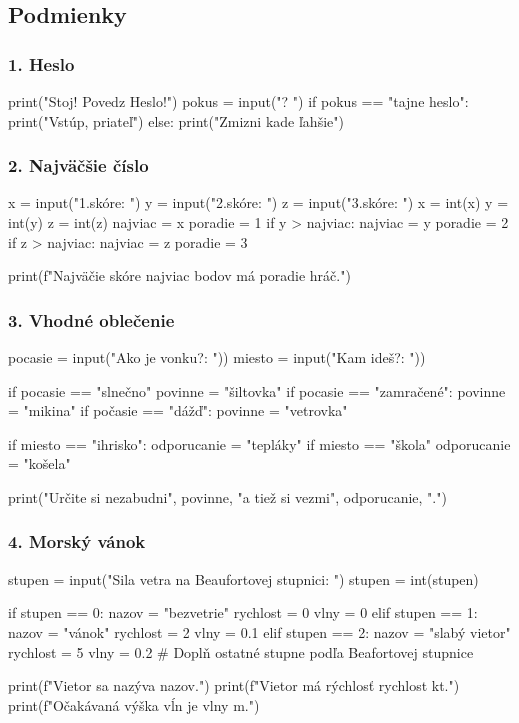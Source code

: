 \subsection{Podmienky}

\subsubsection*{1. Heslo}
\begin{solution}
print("Stoj! Povedz Heslo!")
pokus = input("? ")
if pokus == "tajne heslo":
    print("Vstúp, priateľ")
else:
    print("Zmizni kade ľahšie")
\end{solution}

\subsubsection*{2. Najväčšie číslo}
\begin{solution}
x = input("1.skóre: ")
y = input("2.skóre: ")
z = input("3.skóre: ")
x = int(x)
y = int(y)
z = int(z)
najviac = x
poradie = 1
if y > najviac:
    najviac = y
    poradie = 2
if z > najviac:
    najviac = z
    poradie = 3

print(f"Najväčie skóre {najviac} bodov má {poradie} hráč.")
\end{solution}

\subsubsection*{3. Vhodné oblečenie}

\begin{solution}
pocasie = input("Ako je vonku?: "))
miesto = input("Kam ideš?: "))

if pocasie == "slnečno"
	povinne = "šiltovka"
if pocasie == "zamračené":
	povinne = "mikina"
if počasie == "dážď":
	povinne = "vetrovka"
	
if miesto == "ihrisko":
	odporucanie = "tepláky"
if miesto == "škola"
	odporucanie = "košela"

print("Určite si nezabudni", povinne, "a tiež si vezmi", odporucanie, ".")
\end{solution}

\subsubsection*{4. Morský vánok}
\begin{solution}
stupen = input("Sila vetra na Beaufortovej stupnici: ")
stupen = int(stupen)

if stupen == 0:
	nazov = "bezvetrie"
	rychlost = 0
	vlny = 0
elif stupen == 1:
	nazov = "vánok"
	rychlost = 2
	vlny = 0.1
elif stupen == 2:
	nazov = "slabý vietor"
	rychlost = 5
	vlny = 0.2
# Doplň ostatné stupne podľa Beafortovej stupnice

print(f"Vietor sa nazýva {nazov}.")
print(f"Vietor má rýchlosť {rychlost} kt.")
print(f"Očakávaná výška vĺn je {vlny} m.")
\end{solution}

